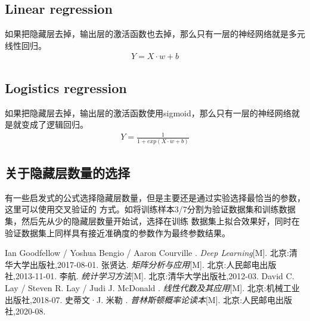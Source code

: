 \documentclass[12pt, a4paper, oneside]{ctexart}
\begin{document}
\subsection{Linear regression}
如果把隐藏层去掉，输出层的激活函数也去掉，那么只有一层的神经网络就是多元线性回归。
\begin{align}
    Y = X \cdot w + b \nonumber
\end{align}
\subsection{Logistics regression}
如果把隐藏层去掉，输出层的激活函数使用sigmoid，那么只有一层的神经网络就是就变成了逻辑回归。
\begin{align}
    Y = \frac{1}{1+exp(X \cdot w + b)} \nonumber
\end{align}
\subsection{关于隐藏层数量的选择}
有一些启发式的公式选择隐藏层数量，但是主要还是通过实验选择最恰当的参数，这里可以使用交叉验证的
方式。如将训练样本3/7分割为验证数据集和训练数据集，然后先从少的隐藏层数量开始试，选择在训练
数据集上拟合效果好，同时在验证数据集上同样具有接近准确度的参数作为最终参数结果。



\newpage
\begin{thebibliography}{99}
    Ian Goodfellow / Yoshua Bengio / Aaron Courville . \emph{Deep Learning}[M]. 北京:清华大学出版社,2017-08-01.
    张贤达. \emph{矩阵分析与应用}[M]. 北京:人民邮电出版社,2013-11-01.
    李航. \emph{统计学习方法}[M]. 北京:清华大学出版社,2012-03.
    David C. Lay / Steven R. Lay / Judi J. McDonald . \emph{线性代数及其应用}[M]. 北京:机械工业出版社,2018-07.
    史蒂文·J. 米勒 . \emph{普林斯顿概率论读本}[M]. 北京:人民邮电出版社,2020-08.
\end{thebibliography}
\end{document}
